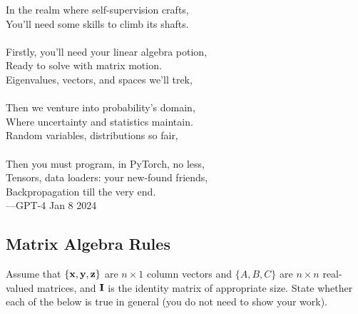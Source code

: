 \documentclass{article}
\begin{document}
\noindent\hfill\begin{minipage}{7cm}
 \begin{framed}
 \footnotesize
In the realm where self-supervision crafts,\\ 
You'll need some skills to climb its shafts. \\ \\
Firstly, you'll need your linear algebra potion, \\ 
Ready to solve with matrix motion. \\ 
Eigenvalues, vectors, and spaces we'll trek, \\ \\
Then we venture into probability's domain, \\ 
Where uncertainty and statistics maintain. \\ 
Random variables, distributions so fair,  \\ \\
Then you must program, in PyTorch, no less, \\ 
Tensors, data loaders: your new-found friends,\\ 
Backpropagation till the very end.  \\

\hspace{3.5cm}---GPT-4 Jan 8 2024 
\end{framed}
\end{minipage}\hfill\null

\subsection{Matrix Algebra Rules}

Assume that $\{\mathbf{x}, \mathbf{y}, \mathbf{z}\}$ are $n \times 1$ column vectors and $\{A, B, C\}$ are $n \times n$ real-valued matrices, 
and $\mathbf{I}$ is the identity matrix of appropriate size. State whether each of the below is true in general (you do not need to show your work).
\end{document}
